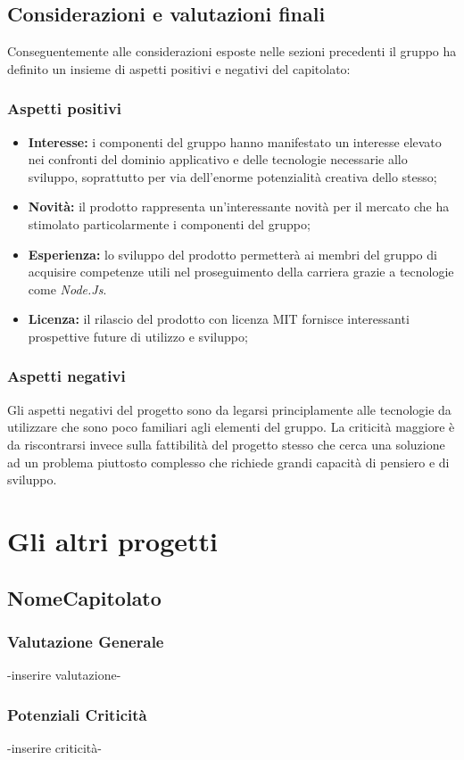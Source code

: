 \documentclass[a4paper]{report}
\newcommand{\mychapter}[2]{
	\setcounter{chapter}{#1}
	\setcounter{section}{0}
	\setcounter{subsection}{1}
	\chapter*{#2}
	\addcontentsline{toc}{chapter}{#2}
}
\begin{document}
      \section{Considerazioni e valutazioni finali}
        Conseguentemente alle considerazioni esposte nelle sezioni precedenti il gruppo ha definito un
        insieme di aspetti positivi e negativi del capitolato:
        \subsection{Aspetti positivi}
          \begin{itemize}
            \item \textbf{Interesse:} i componenti del gruppo hanno manifestato un interesse elevato nei confronti del dominio applicativo e delle tecnologie necessarie
            allo sviluppo, soprattutto per via dell'enorme potenzialità creativa dello stesso;
            \item \textbf{Novità:} il prodotto rappresenta un'interessante novità per il mercato che ha stimolato particolarmente i componenti del gruppo;
            \item \textbf{Esperienza:} lo sviluppo del prodotto permetterà ai membri del gruppo di acquisire competenze utili nel proseguimento della carriera
            grazie a tecnologie come \emph{Node.Js}.
            \item \textbf{Licenza:} il rilascio del prodotto con licenza MIT fornisce interessanti
             prospettive future di utilizzo e sviluppo;
         \end{itemize}
       \subsection{Aspetti negativi}
        Gli aspetti negativi del progetto sono da legarsi principlamente alle tecnologie da utilizzare che sono poco familiari agli elementi del gruppo.
        La criticità maggiore è da riscontrarsi invece sulla fattibilità del progetto stesso che cerca una soluzione ad un problema piuttosto complesso che richiede grandi
        capacità di pensiero e di sviluppo.
  \mychapter{3}{Gli altri progetti}
    \section{NomeCapitolato}
      \subsection{Valutazione Generale}
        -inserire valutazione-
      \subsection{Potenziali Criticità}
       -inserire criticità-


   \cleardoublepage
   \listoftables
\end{document}

